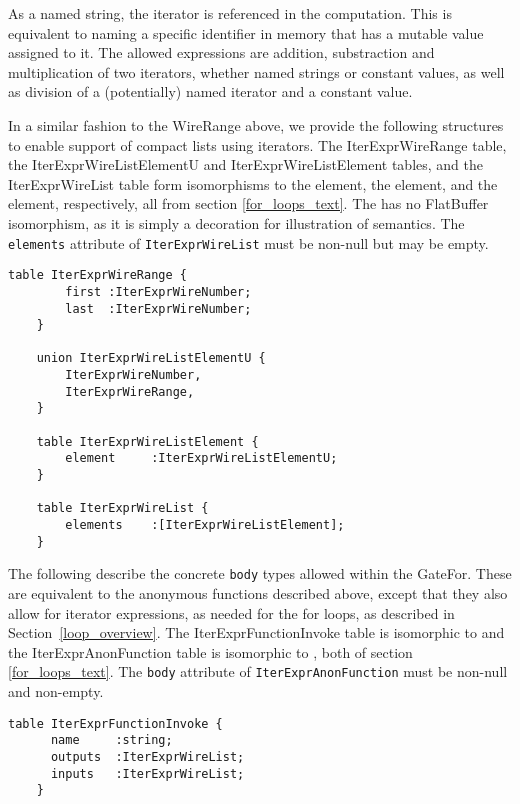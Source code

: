 As a named string, the iterator is referenced in the computation. This is equivalent to naming a specific identifier in memory that has a mutable value assigned to it. The allowed expressions are addition, substraction and multiplication of two iterators, whether named strings or constant values, as well as division of a (potentially) named iterator and a constant value.

In a similar fashion to the \textsf{WireRange} above, we provide the following structures to enable support of compact lists using iterators. The \textsf{IterExprWireRange} table, the \textsf{IterExprWireListElementU} and \textsf{IterExprWireListElement} tables, and the \textsf{IterExprWireList} table form isomorphisms to the  element, the  element, and the  element, respectively, all from section \ref{for_loops_text}. The  has no FlatBuffer isomorphism, as it is simply a decoration for illustration of semantics. The \texttt{elements} attribute of \texttt{IterExprWireList} must be non-null but may be empty.

\begin{lstlisting}[style=fbslisting]
    table IterExprWireRange {
        first :IterExprWireNumber;
        last  :IterExprWireNumber;
    }

    union IterExprWireListElementU {
        IterExprWireNumber,
        IterExprWireRange,
    }

    table IterExprWireListElement {
        element     :IterExprWireListElementU;
    }

    table IterExprWireList {
        elements    :[IterExprWireListElement];
    }
\end{lstlisting}

The following describe the concrete \texttt{body} types allowed within the \textsf{GateFor}. These are equivalent to the anonymous functions described above, except that they also allow for iterator expressions, as needed for the for loops, as described in Section~\ref{loop_overview}. The \textsf{IterExprFunctionInvoke} table is isomorphic to  and the \textsf{IterExprAnonFunction} table is isomorphic to , both of section \ref{for_loops_text}.
The \texttt{body} attribute of \texttt{IterExprAnonFunction} must be non-null and non-empty.

\begin{lstlisting}[style=fbslisting]
    table IterExprFunctionInvoke {
      name     :string;
      outputs  :IterExprWireList;
      inputs   :IterExprWireList;
    }
\end{lstlisting}

